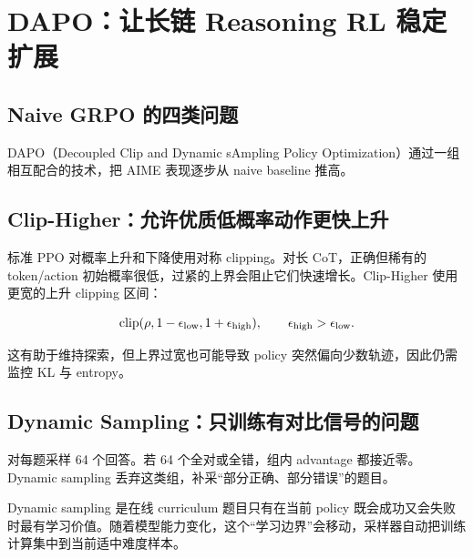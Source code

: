 \section{DAPO：让长链 Reasoning RL 稳定扩展}

\subsection{Naive GRPO 的四类问题}


DAPO（Decoupled Clip and Dynamic sAmpling Policy Optimization）通过一组相互配合的技术，把 AIME 表现逐步从 naive baseline 推高。

\subsection{Clip-Higher：允许优质低概率动作更快上升}

标准 PPO 对概率上升和下降使用对称 clipping。对长 CoT，正确但稀有的 token/action 初始概率很低，过紧的上界会阻止它们快速增长。Clip-Higher 使用更宽的上升 clipping 区间：

$$
\operatorname{clip}(\rho,1-\epsilon_{\rm low},1+\epsilon_{\rm high}),
\qquad \epsilon_{\rm high}>\epsilon_{\rm low}.
$$


这有助于维持探索，但上界过宽也可能导致 policy 突然偏向少数轨迹，因此仍需监控 KL 与 entropy。

\subsection{Dynamic Sampling：只训练有对比信号的问题}

对每题采样 64 个回答。若 64 个全对或全错，组内 advantage 都接近零。Dynamic sampling 丢弃这类组，补采“部分正确、部分错误”的题目。


\begin{knowledgebox}{Dynamic sampling 是在线 curriculum}
题目只有在当前 policy 既会成功又会失败时最有学习价值。随着模型能力变化，这个“学习边界”会移动，采样器自动把训练计算集中到当前适中难度样本。
\end{knowledgebox}

